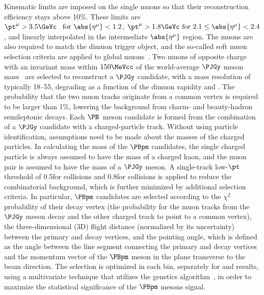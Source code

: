 Kinematic limits are imposed on the single muons so that their reconstruction efficiency stays above 10\%. These limits are $\pt^{\mu}>3.5\GeVc\enspace \text{ for } \abs{\eta^{\mu}}<1.2$, $\pt^{\mu}>1.8\GeVc\text{ for }2.1\le\abs{\eta^{\mu}}<2.4$, and linearly interpolated in the intermediate $\abs{\eta^{\mu}}$ region. The muons are also required to match the dimuon trigger object, and the so-called soft muon selection criteria are applied to global muons~\cite{Chatrchyan:2012xi}. Two muons of opposite charge with an invariant mass within $150\MeVcc$ of the world-average $\PJGy$ meson mass~\cite{pdg:2016} are selected to reconstruct a $\PJGy$ candidate, with a mass resolution of typically 18--55\MeVcc, degrading as a function of the dimuon rapidity and \pt. The probability that the two muon tracks originate from a common vertex is required to be larger than 1\%, lowering the background from charm- and beauty-hadron semileptonic decays. Each $\PB$~meson candidate is formed from the combination of a $\PJGy$ candidate with a charged-particle track. Without using particle identification, assumptions need to be made about the masses of the charged particles. In calculating the mass of the $\PBpm$ candidates, the single charged particle is always assumed to have the mass of a charged kaon, and the muon pair is assumed to have the mass of a $\PJGy$ meson.
A single-track low-$\pt$ threshold of 0.5\GeVc for \pp collisions and 0.8\GeVc for \PbPb collisions is applied to reduce the combinatorial background, which is further minimized by additional selection criteria.
In particular, $\PBpm$ candidates are selected according to the $\chi^{2}$ probability of their decay vertex (the probability for the muon tracks from the $\PJGy$ meson decay and the other charged track to point to a common vertex), the three-dimensional (3D) flight distance (normalized by its uncertainty) between the primary and decay vertices, and the pointing angle, which is defined as the angle between the line segment connecting the primary and decay vertices and the momentum vector of the $\PBpm$ meson in the plane transverse to the beam direction. The selection is optimized in each \pt bin, separately for \pp and \PbPb results, using a multivariate technique that utilizes the genetics algorithm~\cite{Hocker:2007ht}, in order to maximize the statistical significance of the $\PBpm$ mesons signal.

